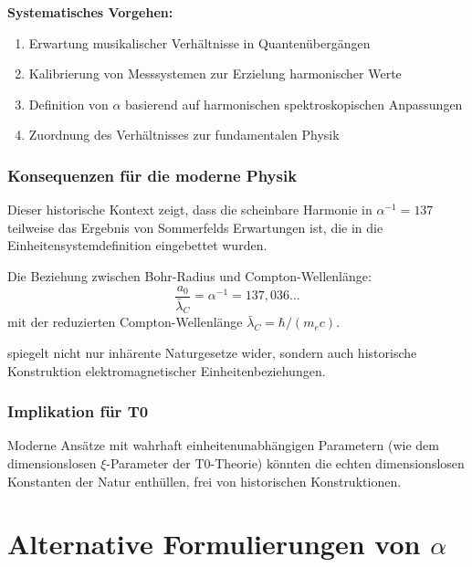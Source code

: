 	\begin{tcolorbox}[colback=blue!5!white,colframe=blue!75!black,title=Sommerfelds Ansatz]
		\textbf{Systematisches Vorgehen:}
		\begin{enumerate}
			\item Erwartung musikalischer Verhältnisse in Quantenübergängen
			\item Kalibrierung von Messsystemen zur Erzielung harmonischer Werte
			\item Definition von $\alpha$ basierend auf harmonischen spektroskopischen Anpassungen
			\item Zuordnung des Verhältnisses zur fundamentalen Physik
		\end{enumerate}
	\end{tcolorbox}
	
	\subsubsection{Konsequenzen für die moderne Physik}
	
	Dieser historische Kontext zeigt, dass die scheinbare Harmonie in $\alpha^{-1} = 137$ teilweise das Ergebnis von Sommerfelds Erwartungen ist, die in die Einheitensystemdefinition eingebettet wurden.
	
	Die Beziehung zwischen Bohr-Radius und Compton-Wellenlänge:
	\begin{equation}
		\frac{a_0}{\bar\lambda_C} = \alpha^{-1} = 137{,}036...
	\end{equation}
	mit der reduzierten Compton-Wellenlänge $\bar\lambda_C = \hbar/(m_e c)$.
	
	spiegelt nicht nur inhärente Naturgesetze wider, sondern auch historische Konstruktion elektromagnetischer Einheitenbeziehungen.
	
	\subsubsection{Implikation für T0}
	
	Moderne Ansätze mit wahrhaft einheitenunabhängigen Parametern (wie dem dimensionslosen $\xi$-Parameter der T0-Theorie) könnten die echten dimensionslosen Konstanten der Natur enthüllen, frei von historischen Konstruktionen.
	
	\section[Alternative Formulierungen von alpha]{Alternative Formulierungen von $\alpha$}
	\label{sec:alternative_formulations}
	
